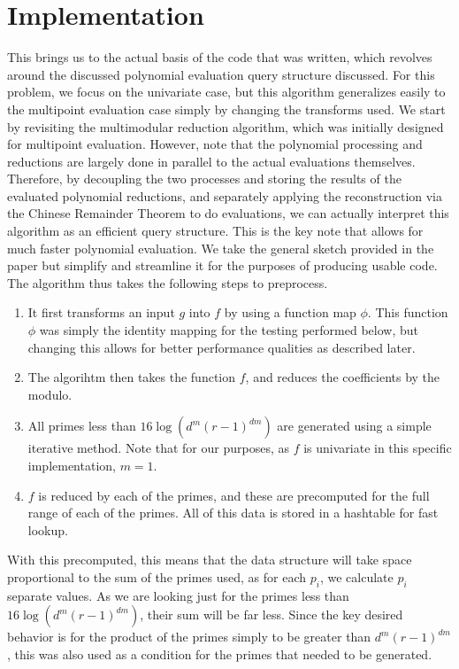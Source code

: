 \documentclass[pageno]{jpaper}
\begin{document}
\section{Implementation}
This brings us to the actual basis of the code that was written, which revolves around the discussed polynomial evaluation query structure discussed.
For this problem, we focus on the univariate case, but this algorithm generalizes easily to the multipoint evaluation case simply by changing the transforms used.
We start by revisiting the multimodular reduction algorithm, which was initially designed for multipoint evaluation.
However, note that the polynomial processing and reductions are largely done in parallel to the actual evaluations themselves.
Therefore, by decoupling the two processes and storing the results of the evaluated polynomial reductions, and separately applying the reconstruction via the Chinese Remainder Theorem to do evaluations, we can actually interpret this algorithm as an efficient query structure.
This is the key note that allows for much faster polynomial evaluation.
We take the general sketch provided in the paper but simplify and streamline it for the purposes of producing usable code.
The algorithm thus takes the following steps to preprocess.
\begin{enumerate}
  \item
    It first transforms an input $g$ into $f$ by using a function map $\phi$.
    This function $\phi$ was simply the identity mapping for the testing performed below, but changing this allows for better performance qualities as described later.
  \item
    The algorihtm then takes the function $f$, and reduces the coefficients by the modulo.
  \item 
    All primes less than $16\log(d^m(r-1)^{dm})$ are generated using a simple iterative method.
    Note that for our purposes, as $f$ is univariate in this specific implementation, $m=1$.
  \item
    $f$ is reduced by each of the primes, and these are precomputed for the full range of each of the primes.
    All of this data is stored in a hashtable for fast lookup.
\end{enumerate}
With this precomputed, this means that the data structure will take space proportional to the sum of the primes used, as for each $p_i$, we calculate $p_i$ separate values.
As we are looking just for the primes less than $16\log(d^m(r-1)^{dm})$, their sum will be far less.
Since the key desired behavior is for the product of the primes simply to be greater than $d^m(r-1)^{dm}$, this was also used as a condition for the primes that needed to be generated.
\end{document}
